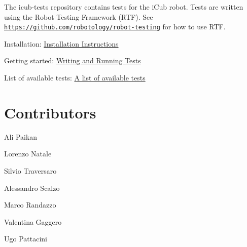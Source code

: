 The {\ttfamily icub-\/tests} repository contains tests for the i\+Cub robot. Tests are written using the Robot Testing Framework (R\+TF). See \href{https://github.com/robotology/robot-testing}{\tt https\+://github.\+com/robotology/robot-\/testing} for how to use R\+TF.

\begin{DoxyItemize}
\item Installation\+: \hyperlink{installation}{Installation Instructions} \item Getting started\+: \hyperlink{writing-and-running}{Writing and Running Tests} \item List of available tests\+: \hyperlink{group__icub-tests}{A list of available tests}\end{DoxyItemize}
\hypertarget{index_contributors}{}\section{Contributors}\label{index_contributors}
\begin{DoxyItemize}
\item Ali Paikan \item Lorenzo Natale \item Silvio Traversaro \item Alessandro Scalzo \item Marco Randazzo \item Valentina Gaggero \item Ugo Pattacini \end{DoxyItemize}
